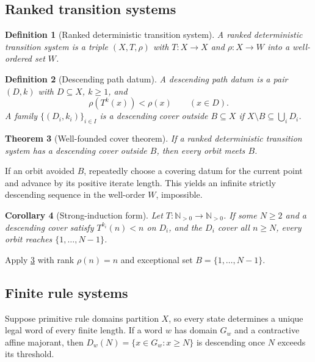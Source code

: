 \documentclass[12pt,a4paper,twoside]{extarticle}
\makeatletter
\theoremstyle{compactplain}
\newtheorem{theorem}{Theorem}[section]
\newtheorem{corollary}[theorem]{Corollary}
\theoremstyle{compactdef}
\newtheorem{definition}[theorem]{Definition}
\renewenvironment{proof}[1][\proofname]{\par\pushQED{\qed}\normalfont
  \topsep2pt\trivlist\item[\hskip\labelsep\bfseries #1\@addpunct{.}]\ignorespaces}
 {\popQED\endtrivlist\@endpefalse}
\newcommand{\Npos}{\mathbb N_{>0}}
\makeatother
\begin{document}
\subsection{Ranked transition systems}
\begin{definition}[Ranked deterministic transition system]
A ranked deterministic transition system is a triple $(X,T,\rho)$ with $T:X\to X$ and $\rho:X\to W$ into a well-ordered set $W$.
\end{definition}

\begin{definition}[Descending path datum]
A descending path datum is a pair $(D,k)$ with $D\subseteq X$, $k\ge1$, and
\[
\rho(T^k(x))<\rho(x)\qquad(x\in D).
\]
A family $\{(D_i,k_i)\}_{i\in I}$ is a descending cover outside $B\subseteq X$ if $X\setminus B\subseteq\bigcup_iD_i$.
\end{definition}

\begin{theorem}[Well-founded cover theorem]\label{thm:well-founded-cover}
If a ranked deterministic transition system has a descending cover outside $B$, then every orbit meets $B$.
\end{theorem}
\begin{proof}
If an orbit avoided $B$, repeatedly choose a covering datum for the current point and advance by its positive iterate length. This yields an infinite strictly descending sequence in the well-order $W$, impossible.
\end{proof}

\begin{corollary}[Strong-induction form]\label{cor:strong-induction}
Let $T:\Npos\to\Npos$. If some $N\ge2$ and a descending cover satisfy $T^{k_i}(n)<n$ on $D_i$, and the $D_i$ cover all $n\ge N$, every orbit reaches $\{1,\dots,N-1\}$.
\end{corollary}
\begin{proof}
Apply \cref{thm:well-founded-cover} with rank $\rho(n)=n$ and exceptional set $B=\{1,\dots,N-1\}$.
\end{proof}

\subsection{Finite rule systems}
Suppose primitive rule domains partition $X$, so every state determines a unique legal word of every finite length. If a word $w$ has domain $G_w$ and a contractive affine majorant, then $D_w(N)=\{x\in G_w:x\ge N\}$ is descending once $N$ exceeds its threshold.
\end{document}
